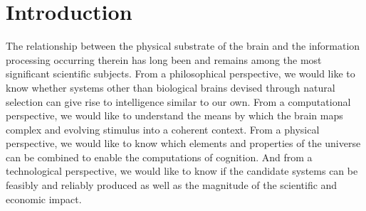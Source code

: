 \documentclass[twocolumn]{article}
\begin{document}
\vspace{3em}

\setcounter{tocdepth}{4}
\setcounter{secnumdepth}{4}
\tableofcontents

\section{\label{sec:introduction}Introduction}
The relationship between the physical substrate of the brain and the information processing occurring therein has long been and remains among the most significant scientific subjects. From a philosophical perspective, we would like to know whether systems other than biological brains devised through natural selection can give rise to intelligence similar to our own. From a computational perspective, we would like to understand the means by which the brain maps complex and evolving stimulus into a coherent context. From a physical perspective, we would like to know which elements and properties of the universe can be combined to enable the computations of cognition. And from a technological perspective, we would like to know if the candidate systems can be feasibly and reliably produced as well as the magnitude of the scientific and economic impact.
\end{document}
